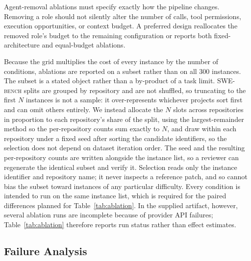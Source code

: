 \documentclass[journal]{IEEEtran}
\newcommand{\swebench}{\textsc{SWE-bench}}
\begin{document}
Agent-removal ablations must specify exactly how the pipeline changes. Removing a role should not silently alter the number of calls, tool permissions, execution opportunities, or context budget. A preferred design reallocates the removed role's budget to the remaining configuration or reports both fixed-architecture and equal-budget ablations.

Because the grid multiplies the cost of every instance by the number of conditions, ablations are reported on a subset rather than on all 300 instances. The subset is a stated object rather than a by-product of a task limit. \swebench{} splits are grouped by repository and are not shuffled, so truncating to the first $N$ instances is not a sample: it over-represents whichever projects sort first and can omit others entirely. We instead allocate the $N$ slots across repositories in proportion to each repository's share of the split, using the largest-remainder method so the per-repository counts sum exactly to $N$, and draw within each repository under a fixed seed after sorting the candidate identifiers, so the selection does not depend on dataset iteration order. The seed and the resulting per-repository counts are written alongside the instance list, so a reviewer can regenerate the identical subset and verify it. Selection reads only the instance identifier and repository name; it never inspects a reference patch, and so cannot bias the subset toward instances of any particular difficulty. Every condition is intended to run on the same instance list, which is required for the paired differences planned for Table~\ref{tab:ablation}. In the supplied artifact, however, several ablation runs are incomplete because of provider API failures; Table~\ref{tab:ablation} therefore reports run status rather than effect estimates.

\begin{table}[t]
\centering
\caption{Status of the pre-specified ablation runs in the supplied artifact. Because most ablations have no official harness report and several were interrupted by provider API failures, resolution effects and paired differences are not reported. ``Completed'' counts trajectories that reached the repair loop without a top-level run error.}
\label{tab:ablation}
\resizebox{\linewidth}{!}{}
\end{table}

\subsection{Failure Analysis}
\end{document}
